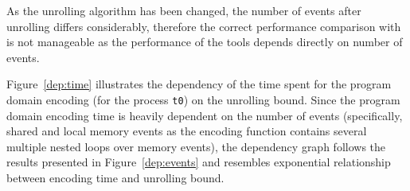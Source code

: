 As the unrolling algorithm has been changed, the number of events after unrolling differs considerably, therefore the correct performance comparison with \porthos[1] is not manageable as the performance of the tools depends directly on number of events.




Figure~\ref{dep:time} illustrates the dependency of the time spent for the program domain encoding (for the process \texttt{t0}) on the unrolling bound.
Since the program domain encoding time is heavily dependent on the number of events (specifically, shared and local memory events as the encoding function contains several multiple nested loops over memory events), the dependency graph follows the results presented in Figure~\ref{dep:events} and resembles exponential relationship between encoding time and unrolling bound.

